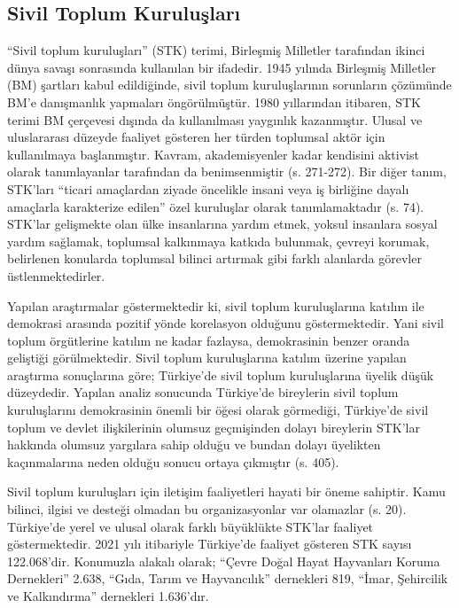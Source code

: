 \documentclass[
]{book}
\begin{document}
\hypertarget{sivil-toplum-kuruluux15flarux131}{%
\subsection{Sivil Toplum Kuruluşları}\label{sivil-toplum-kuruluux15flarux131}}

``Sivil toplum kuruluşları'' (STK) terimi, Birleşmiş Milletler tarafından ikinci dünya savaşı sonrasında kullanılan bir ifadedir. 1945 yılında Birleşmiş Milletler (BM) şartları kabul edildiğinde, sivil toplum kuruluşlarının sorunların çözümünde BM'e danışmanlık yapmaları öngörülmüştür. 1980 yıllarından itibaren, STK terimi BM çerçevesi dışında da kullanılması yaygınlık kazanmıştır. Ulusal ve uluslararası düzeyde faaliyet gösteren her türden toplumsal aktör için kullanılmaya başlanmıştır. Kavram, akademisyenler kadar kendisini aktivist olarak tanımlayanlar tarafından da benimsenmiştir (s. 271-272). \citep{martens2002mission} Bir diğer tanım, STK'ları ``ticari amaçlardan ziyade öncelikle insani veya iş birliğine dayalı amaçlarla karakterize edilen'' özel kuruluşlar olarak tanımlamaktadır (s. 74). \citep{werker2008nongovernmental} STK'lar gelişmekte olan ülke insanlarına yardım etmek, yoksul insanlara sosyal yardım sağlamak, toplumsal kalkınmaya katkıda bulunmak, çevreyi korumak, belirlenen konularda toplumsal bilinci artırmak gibi farklı alanlarda görevler üstlenmektedirler.

Yapılan araştırmalar göstermektedir ki, sivil toplum kuruluşlarına katılım ile demokrasi arasında pozitif yönde korelasyon olduğunu göstermektedir. Yani sivil toplum örgütlerine katılım ne kadar fazlaysa, demokrasinin benzer oranda geliştiği görülmektedir. Sivil toplum kuruluşlarına katılım üzerine yapılan araştırma sonuçlarına göre; Türkiye'de sivil toplum kuruluşlarına üyelik düşük düzeydedir. Yapılan analiz sonucunda Türkiye'de bireylerin sivil toplum kuruluşlarını demokrasinin önemli bir öğesi olarak görmediği, Türkiye'de sivil toplum ve devlet ilişkilerinin olumsuz geçmişinden dolayı bireylerin STK'lar hakkında olumsuz yargılara sahip olduğu ve bundan dolayı üyelikten kaçınmalarına neden olduğu sonucu ortaya çıkmıştır (s. 405). \citep{sahin2019turkiye}

Sivil toplum kuruluşları için iletişim faaliyetleri hayati bir öneme sahiptir. Kamu bilinci, ilgisi ve desteği olmadan bu organizasyonlar var olamazlar (s. 20). \citep{schoenfeld1981environmental} Türkiye'de yerel ve ulusal olarak farklı büyüklükte STK'lar faaliyet göstermektedir. 2021 yılı itibariyle Türkiye'de faaliyet gösteren STK sayısı 122.068'dir. Konumuzla alakalı olarak; ``Çevre Doğal Hayat Hayvanları Koruma Dernekleri'' 2.638, ``Gıda, Tarım ve Hayvancılık'' dernekleri 819, ``İmar, Şehircilik ve Kalkındırma'' dernekleri 1.636'dır.
\end{document}
